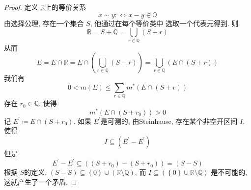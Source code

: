 \documentclass[../main.tex]{subfiles}
\begin{document}
\begin{proof}
    定义 \(  \mathbb{R}   \)上的等价关系 \[
    x\sim y:\iff x-y\in \mathbb{Q} 
    \] 由选择公理, 存在一个集合 \(  S  \), 他通过在每个等价类中 选取一个代表元得到. 则 \[
    \mathbb{R} = S+ \mathbb{Q} = \bigcup _{r\in \mathbb{Q} }\left( S+ r \right) 
    \]从而 \[
    E= E\cap \mathbb{R} = E\cap \left( \bigcup _{r\in \mathbb{Q} }\left( S+ r \right)  \right)= \bigcup _{r\in \mathbb{Q} }\left( E\cap \left( S+ r \right)  \right)  
    \]我们有 \[
    0< m\left( E \right)\le \sum _{r \in \mathbb{Q} }m^{*}\left( E\cap \left( S+ r \right)  \right)  
    \]存在 \(  r_0\in \mathbb{Q}   \), 使得 \[
    m^{*}\left( E\cap \left( S+ r_0 \right)  \right)> 0 
    \] 记 \(  E^{\prime} \coloneqq E\cap \left( S+ r_0 \right)   \). 如果 \(  E^{\prime}   \)是可测的, 由Steinhause, 存在某个非空开区间 \(  I  \), 使得 \[
    I\subseteq \left( E^{\prime} -E^{\prime}  \right) 
    \]   但是 \[
    E^{\prime} -E^{\prime} \subseteq \left( \left( S+ r_0 \right)-\left( S+ r_0 \right)   \right)=\left( S- S \right) 
    \]根据 \(  S  \)的定义, \(  \left( S-S \right)\subseteq \left\{ 0 \right\}\cup \left( \mathbb{R} \setminus \mathbb{Q}  \right)    \), 而 \(  I\subseteq \left( \left\{ 0 \right\}\cup \mathbb{R} \setminus \mathbb{Q}  \right)   \)  是不可能的, 这就产生了一个矛盾.
\end{proof}
\end{document}
